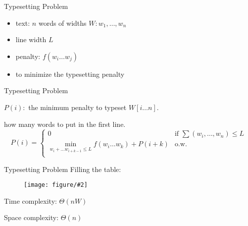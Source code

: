 \documentclass{beamer}
\newcommand{\fig}[2]
{
  \begin{figure}[htp]
	  \centering
	  \texttt{[image: figure/\#2]}
  \end{figure}
}
\begin{document}
\begin{frame}{Typesetting Problem}
  \begin{problem}
    \begin{itemize}
      \item text: $n$ words of widths $W: w_1, \ldots, w_n$
      \item line width $L$
      \item penalty: $f(w_i \ldots w_j)$
      \item {} to minimize the typesetting penalty
    \end{itemize}
  \end{problem}
\end{frame}
\begin{frame}{Typesetting Problem}
  \begin{mdframed}[rightmargin = 2cm]
    $P(i):$ the minimum penalty to typeset $W[i \ldots n]$.
  \end{mdframed}
  
  \vspace{0.50cm}
  \begin{theorem}[Recurrence]
     how many words to put in the first line.
    \begin{displaymath}
      P(i) = \left\{
        \begin{array}{ll}
          0 & \textrm{if } \sum (w_i, \ldots, w_n) \le L  \\
          \min_{w_i + \ldots w_{i+k-1} \le L} f(w_i \ldots w_k) + P(i+k) &
          \textrm{o.w.}
          \\
        \end{array}
      \right.
    \end{displaymath}
  \end{theorem}
\end{frame}
\begin{frame}{Typesetting Problem}
  Filling the table:
  \fig{width = 0.60\textwidth}{typesettingorder}
  \vspace{0.50cm}
  
  Time complexity: $\Theta(nW)$
  
  Space complexity: $\Theta(n)$
\end{frame}
\end{document}
